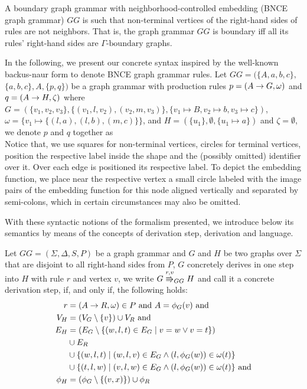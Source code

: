 \documentclass[runningheads]{llncs}
\begin{document}
\begin{definition}
	A boundary graph grammar with neighborhood-controlled embedding (BNCE graph grammar) $GG$ is such that non-terminal vertices of the right-hand sides of rules are not neighbors. That is, the graph grammar $GG$ is boundary iff all its rules' right-hand sides are $\Gamma\text{-boundary}$ graphs.
\end{definition}

In the following, we present our concrete syntax inspired by the well-known backus-naur form to denote BNCE graph grammar rules. Let $GG = (\{A,a,b,c\},$ $\{a,b,c\}, A, \{p,q\})$ be a graph grammar with production rules $p = (A \to G,\omega)$ and $q = (A \to H,\zeta)$ where $G = (\{v_1, v_2, v_3\}, \{(v_1,l,v_2), (v_2,m,v_3)\}, \{v_1 \mapsto B, v_2 \mapsto b, v_3 \mapsto c \})$, $\omega = \{v_1 \mapsto \{(l,a), (l,b), (m,c)\}\}$, and $H = (\{u_1\}, \emptyset, \{u_1 \mapsto a\})$ and $\zeta = \emptyset$, we denote $p$ and $q$ together as\\


Notice that, we use squares for non-terminal vertices, circles for terminal vertices, position the respective label inside the shape and the (possibly omitted) identifier over it. Over each edge is positioned its respective label. To depict the embedding function, we place near the respective vertex a small circle labeled with the image pairs of the embedding function for this node aligned vertically and separated by semi-colons, which in certain circumstances may also be omitted.

With these syntactic notions of the formalism presented, we introduce below its semantics by means of the concepts of derivation step, derivation and language.

\begin{definition}
	\label{def:gg_dstep}
	Let $GG = (\Sigma, \Delta, S, P)$ be a graph grammar and $G$ and $H$ be two graphs over $\Sigma$ that are disjoint to all right-hand sides from $P$, $G$ concretely derives in one step into $H$ with rule $r$ and vertex $v$, we write $G \cderiv{r}{v}{GG} H$ and call it a concrete derivation step, if, and only if, the following holds:
	\begin{align*}
		r & = (A \to R, \omega) \in P \text{ and } A = \phi_G(v) \text{ and} \\
		V_H  & = (V_G \setminus \{v\}) \cup V_R \text{ and} \\
		E_H & = (E_G \setminus \{(w,l,t) \in E_G \; | \; v = w \lor v = t\}) \\
		& \cup E_R \\
		& \cup \{(w,l,t) \; | \; (w,l,v) \in E_G \land (l,\phi_G(w)) \in \omega(t)\} \\
		& \cup \{(t,l,w) \; | \; (v,l,w) \in E_G \land (l,\phi_G(w)) \in \omega(t)\} \text{ and} \\
		\phi_H & = (\phi_G \setminus \{(v,x)\}) \cup \phi_R
	\end{align*}
\end{definition}
\end{document}
